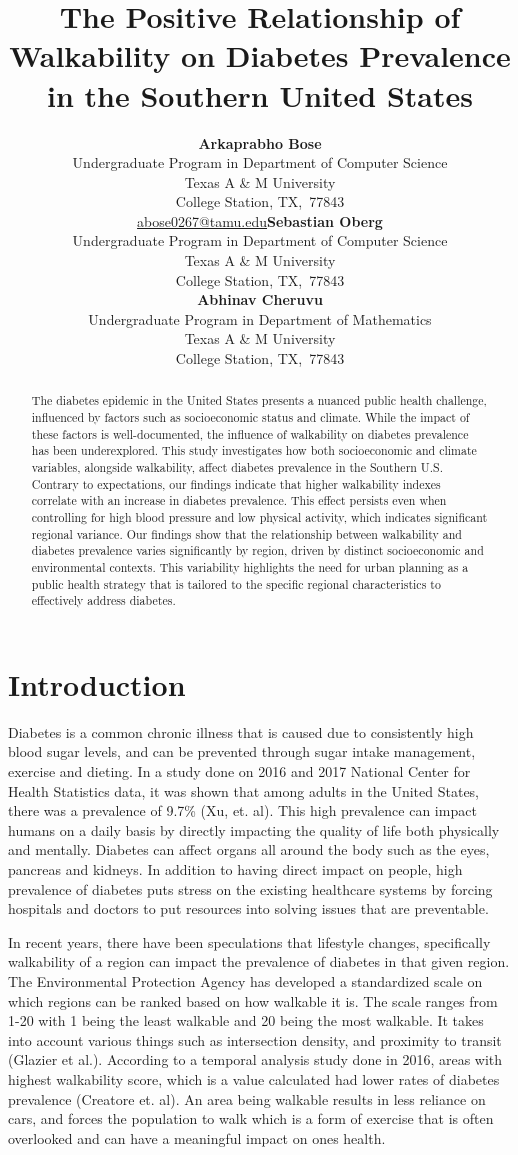 \documentclass[
]{article}
\title{The Positive Relationship of Walkability on Diabetes Prevalence
in the Southern United States}
\author{\textbf{Arkaprabho Bose}\\Undergraduate Program in Department of
Computer Science\\Texas A \& M University\\College Station,
TX,\ 77843\\\href{mailto:abose0267@tamu.edu}{abose0267@tamu.edu}\asep\textbf{Sebastian
Oberg}\\Undergraduate Program in Department of Computer Science\\Texas A
\& M University\\College Station, TX,\ 77843\\\asep\textbf{Abhinav
Cheruvu}\\Undergraduate Program in Department of Mathematics\\Texas A \&
M University\\College Station, TX,\ 77843\\}
\date{}
\begin{document}
\maketitle
\begin{abstract}
The diabetes epidemic in the United States presents a nuanced public
health challenge, influenced by factors such as socioeconomic status and
climate. While the impact of these factors is well-documented, the
influence of walkability on diabetes prevalence has been underexplored.
This study investigates how both socioeconomic and climate variables,
alongside walkability, affect diabetes prevalence in the Southern U.S.
Contrary to expectations, our findings indicate that higher walkability
indexes correlate with an increase in diabetes prevalence. This effect
persists even when controlling for high blood pressure and low physical
activity, which indicates significant regional variance. Our findings
show that the relationship between walkability and diabetes prevalence
varies significantly by region, driven by distinct socioeconomic and
environmental contexts. This variability highlights the need for urban
planning as a public health strategy that is tailored to the specific
regional characteristics to effectively address diabetes.
\end{abstract}

\section{Introduction}\label{sec-intro}

Diabetes is a common chronic illness that is caused due to consistently
high blood sugar levels, and can be prevented through sugar intake
management, exercise and dieting. In a study done on 2016 and 2017
National Center for Health Statistics data, it was shown that among
adults in the United States, there was a prevalence of 9.7\% (Xu, et.
al). This high prevalence can impact humans on a daily basis by directly
impacting the quality of life both physically and mentally. Diabetes can
affect organs all around the body such as the eyes, pancreas and
kidneys. In addition to having direct impact on people, high prevalence
of diabetes puts stress on the existing healthcare systems by forcing
hospitals and doctors to put resources into solving issues that are
preventable.

In recent years, there have been speculations that lifestyle changes,
specifically walkability of a region can impact the prevalence of
diabetes in that given region. The Environmental Protection Agency has
developed a standardized scale on which regions can be ranked based on
how walkable it is. The scale ranges from 1-20 with 1 being the least
walkable and 20 being the most walkable. It takes into account various
things such as intersection density, and proximity to transit (Glazier
et al.). According to a temporal analysis study done in 2016, areas with
highest walkability score, which is a value calculated had lower rates
of diabetes prevalence (Creatore et. al). An area being walkable results
in less reliance on cars, and forces the population to walk which is a
form of exercise that is often overlooked and can have a meaningful
impact on ones health.
\end{document}
